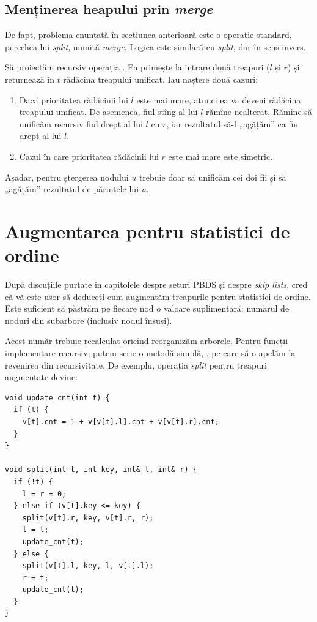 \documentclass[../main.tex]{subfiles}
\begin{document}
\subsection{Menținerea heapului prin \textit{merge}}

De fapt, problema enunțată în secțiunea anterioară este o operație standard, perechea lui \textit{split}, numită \textit{merge}. Logica este similară cu \textit{split}, dar în sens invers.

Să proiectăm recursiv operația . Ea primește la intrare două treapuri ($l$ și $r$) și returnează în $t$ rădăcina treapului unificat. Iau naștere două cazuri:

\begin{enumerate}
  \item Dacă prioritatea rădăcinii lui $l$ este mai mare, atunci ea va deveni rădăcina treapului unificat. De asemenea, fiul stîng al lui $l$ rămîne nealterat. Rămîne să unificăm recursiv fiul drept al lui $l$ cu $r$, iar rezultatul să-l „agățăm” ca fiu drept al lui $l$.
  \item Cazul în care prioritatea rădăcinii lui $r$ este mai mare este simetric.
\end{enumerate}

Așadar, pentru ștergerea nodului $u$ trebuie doar să unificăm cei doi fii și să „agățăm” rezultatul de părintele lui $u$.


\section{Augmentarea pentru statistici de ordine}

După discuțiile purtate în capitolele despre seturi PBDS și despre \textit{skip lists}, cred că vă este ușor să deduceți cum augmentăm treapurile pentru statistici de ordine. Este suficient să păstrăm pe fiecare nod o valoare suplimentară: numărul de noduri din subarbore (inclusiv nodul însuși).

Acest număr trebuie recalculat oricînd reorganizăm arborele. Pentru funcții implementare recursiv, putem scrie o metodă simplă, , pe care să o apelăm la revenirea din recursivitate. De exemplu, operația \textit{split} pentru treapuri augmentate devine:

\begin{verbatim}
void update_cnt(int t) {
  if (t) {
    v[t].cnt = 1 + v[v[t].l].cnt + v[v[t].r].cnt;
  }
}

void split(int t, int key, int& l, int& r) {
  if (!t) {
    l = r = 0;
  } else if (v[t].key <= key) {
    split(v[t].r, key, v[t].r, r);
    l = t;
    update_cnt(t);
  } else {
    split(v[t].l, key, l, v[t].l);
    r = t;
    update_cnt(t);
  }
}
\end{verbatim}
\end{document}
